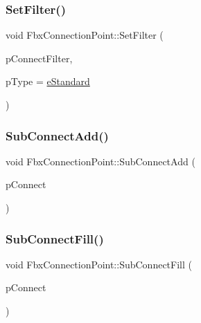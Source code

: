 \subsubsection{\texorpdfstring{Set\+Filter()}{SetFilter()}}
{\footnotesize\ttfamily void Fbx\+Connection\+Point\+::\+Set\+Filter (\begin{DoxyParamCaption}\item[{\hyperlink{class_fbx_connection_point_filter}{Fbx\+Connection\+Point\+Filter} $\ast$}]{p\+Connect\+Filter,  }\item[{\hyperlink{class_fbx_connection_point_a152767d2d289717698ab68d808f979b5}{E\+Type}}]{p\+Type = {\ttfamily \hyperlink{class_fbx_connection_point_a152767d2d289717698ab68d808f979b5af32832e57001937110a6f8b1c4ce1160}{e\+Standard}} }\end{DoxyParamCaption})}

\mbox{\label{class_fbx_connection_point_a00b7c81a489585571eceabf08890fa86}} 
\subsubsection{\texorpdfstring{Sub\+Connect\+Add()}{SubConnectAdd()}}
{\footnotesize\ttfamily void Fbx\+Connection\+Point\+::\+Sub\+Connect\+Add (\begin{DoxyParamCaption}\item[{\hyperlink{class_fbx_connection_point}{Fbx\+Connection\+Point} $\ast$}]{p\+Connect }\end{DoxyParamCaption})\hspace{0.3cm}{\ttfamily [protected]}}

\mbox{\label{class_fbx_connection_point_aaad43b803b8051e8b154bceabdd309a2}} 
\subsubsection{\texorpdfstring{Sub\+Connect\+Fill()}{SubConnectFill()}}
{\footnotesize\ttfamily void Fbx\+Connection\+Point\+::\+Sub\+Connect\+Fill (\begin{DoxyParamCaption}\item[{\hyperlink{class_fbx_connection_point}{Fbx\+Connection\+Point} $\ast$}]{p\+Connect }\end{DoxyParamCaption})\hspace{0.3cm}{\ttfamily [protected]}}

